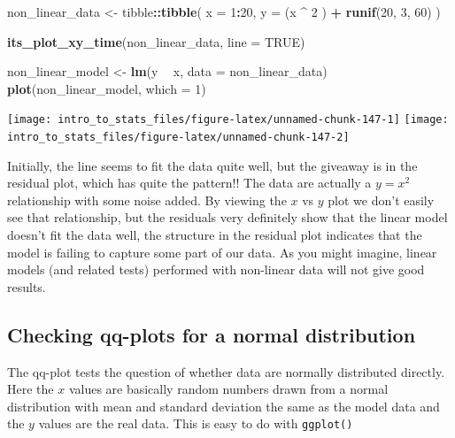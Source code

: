 \documentclass[
]{book}
\newenvironment{Shaded}{\begin{snugshade}}{\end{snugshade}}
\newcommand{\DataTypeTok}[1]{\textcolor[rgb]{0.13,0.29,0.53}{#1}}
\newcommand{\DecValTok}[1]{\textcolor[rgb]{0.00,0.00,0.81}{#1}}
\newcommand{\KeywordTok}[1]{\textcolor[rgb]{0.13,0.29,0.53}{\textbf{#1}}}
\newcommand{\NormalTok}[1]{#1}
\newcommand{\OperatorTok}[1]{\textcolor[rgb]{0.81,0.36,0.00}{\textbf{#1}}}
\newcommand{\OtherTok}[1]{\textcolor[rgb]{0.56,0.35,0.01}{#1}}
\newcommand{\StringTok}[1]{\textcolor[rgb]{0.31,0.60,0.02}{#1}}
\begin{document}
\begin{Shaded}
\begin{Highlighting}[]
\NormalTok{non_linear_data <-}\StringTok{ }\NormalTok{tibble}\OperatorTok{::}\KeywordTok{tibble}\NormalTok{(}
  \DataTypeTok{x =} \DecValTok{1}\OperatorTok{:}\DecValTok{20}\NormalTok{,}
  \DataTypeTok{y =}\NormalTok{ (x }\OperatorTok{^}\StringTok{ }\DecValTok{2}\NormalTok{ ) }\OperatorTok{+}\StringTok{ }\KeywordTok{runif}\NormalTok{(}\DecValTok{20}\NormalTok{, }\DecValTok{3}\NormalTok{, }\DecValTok{60}\NormalTok{)}
\NormalTok{)}

\KeywordTok{its_plot_xy_time}\NormalTok{(non_linear_data, }\DataTypeTok{line =} \OtherTok{TRUE}\NormalTok{)}

\NormalTok{non_linear_model <-}\StringTok{ }\KeywordTok{lm}\NormalTok{(y }\OperatorTok{~}\StringTok{ }\NormalTok{x, }\DataTypeTok{data =}\NormalTok{ non_linear_data)}
\KeywordTok{plot}\NormalTok{(non_linear_model, }\DataTypeTok{which =} \DecValTok{1}\NormalTok{)}
\end{Highlighting}
\end{Shaded}

\texttt{[image: intro\_to\_stats\_files/figure-latex/unnamed-chunk-147-1]} \texttt{[image: intro\_to\_stats\_files/figure-latex/unnamed-chunk-147-2]}

Initially, the line seems to fit the data quite well, but the giveaway is in the residual plot, which has quite the pattern!! The data are actually a \(y = x^2\) relationship with some noise added. By viewing the \(x\) vs \(y\) plot we don't easily see that relationship, but the residuals very definitely show that the linear model doesn't fit the data well, the structure in the residual plot indicates that the model is failing to capture some part of our data. As you might imagine, linear models (and related tests) performed with non-linear data will not give good results.

\hypertarget{checking-qq-plots-for-a-normal-distribution}{%
\subsection{Checking qq-plots for a normal distribution}\label{checking-qq-plots-for-a-normal-distribution}}

The qq-plot tests the question of whether data are normally distributed directly. Here the \(x\) values are basically random numbers drawn from a normal distribution with mean and standard deviation the same as the model data and the \(y\) values are the real data. This is easy to do with \texttt{ggplot()}
\end{document}
